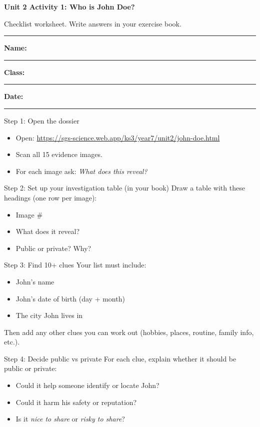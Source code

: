 \documentclass[10pt,a4paper]{article}
\newcommand{\NameLine}{\textbf{Name:} \rule{6.8cm}{0.4pt}\hfill \textbf{Class:} \rule{3cm}{0.4pt}\hfill \textbf{Date:} \rule{3cm}{0.4pt}}
\begin{document}
{\Large\bfseries\color{sgsNavy} Unit 2 Activity 1: Who is John Doe?\par}
{\color{sgsGrey}Checklist worksheet. Write answers in your exercise book.\par}
\vspace{0.2em}
\hrule
\vspace{0.6em}
\NameLine

\vspace{0.6em}
\begin{StepBox}{Step 1: Open the dossier}
\begin{itemize}[leftmargin=*,label=$\square$,nosep]
  \item Open: \url{https://sgs-science.web.app/ks3/year7/unit2/john-doe.html}
  \item Scan all 15 evidence images.
  \item For each image ask: \textit{What does this reveal?}
\end{itemize}
\end{StepBox}

\begin{StepBox}{Step 2: Set up your investigation table (in your book)}
Draw a table with these headings (one row per image):
\begin{itemize}[leftmargin=*,label=$\square$,nosep]
  \item Image \#
  \item What does it reveal?
  \item Public or private? Why?
\end{itemize}
\end{StepBox}

\begin{StepBox}{Step 3: Find 10+ clues}
Your list must include:
\begin{itemize}[leftmargin=*,label=$\square$,nosep]
  \item John's name
  \item John's date of birth (day + month)
  \item The city John lives in
\end{itemize}
Then add any other clues you can work out (hobbies, places, routine, family info, etc.).
\end{StepBox}

\begin{StepBox}{Step 4: Decide public vs private}
For each clue, explain whether it should be public or private:
\begin{itemize}[leftmargin=*,label=$\square$,nosep]
  \item Could it help someone identify or locate John?
  \item Could it harm his safety or reputation?
  \item Is it \textit{nice to share} or \textit{risky to share}?
\end{itemize}
\end{StepBox}
\end{document}
